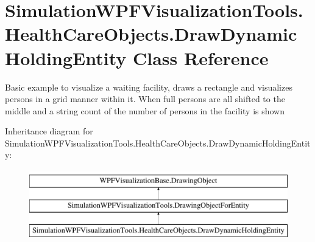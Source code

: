 \hypertarget{class_simulation_w_p_f_visualization_tools_1_1_health_care_objects_1_1_draw_dynamic_holding_entity}{}\section{Simulation\+W\+P\+F\+Visualization\+Tools.\+Health\+Care\+Objects.\+Draw\+Dynamic\+Holding\+Entity Class Reference}
\label{class_simulation_w_p_f_visualization_tools_1_1_health_care_objects_1_1_draw_dynamic_holding_entity}


Basic example to visualize a waiting facility, draws a rectangle and visualizes persons in a grid manner within it. When full persons are all shifted to the middle and a string count of the number of persons in the facility is shown  


Inheritance diagram for Simulation\+W\+P\+F\+Visualization\+Tools.\+Health\+Care\+Objects.\+Draw\+Dynamic\+Holding\+Entity\+:\begin{figure}[H]
\begin{center}
\leavevmode
\includegraphics[height=3.000000cm]{class_simulation_w_p_f_visualization_tools_1_1_health_care_objects_1_1_draw_dynamic_holding_entity}
\end{center}
\end{figure}

